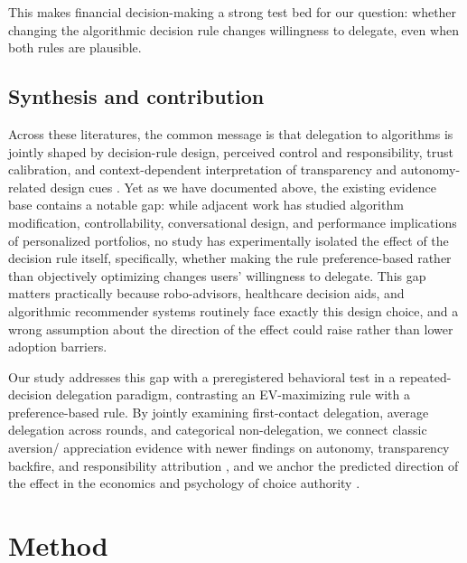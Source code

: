 \documentclass[a4paper, 12pt, fleqn]{article}
\theoremstyle{definition}
\begin{document}
This makes financial decision-making a strong test bed for our question: whether changing the algorithmic decision rule changes willingness to delegate, even when both rules are plausible.

\subsection{Synthesis and contribution}
Across these literatures, the common message is that delegation to algorithms is jointly shaped by decision-rule design, perceived control and responsibility, trust calibration, and context-dependent interpretation of transparency and autonomy-related design cues \citep{Dietvorst2018,Chugunova2022,Schaap2024,Fink2024,Hu2024}. Yet as we have documented above, the existing evidence base contains a notable gap: while adjacent work has studied algorithm modification, controllability, conversational design, and performance implications of personalized portfolios, no study has experimentally isolated the effect of the decision rule itself, specifically, whether making the rule preference-based rather than objectively optimizing changes users' willingness to delegate. This gap matters practically because robo-advisors, healthcare decision aids, and algorithmic recommender systems routinely face exactly this design choice, and a wrong assumption about the direction of the effect could raise rather than lower adoption barriers.

Our study addresses this gap with a preregistered behavioral test in a repeated-decision delegation paradigm, contrasting an EV-maximizing rule with a preference-based rule. By jointly examining first-contact delegation, average delegation across rounds, and categorical non-delegation, we connect classic aversion/ appreciation evidence with newer findings on autonomy, transparency backfire, and responsibility attribution \citep{Logg2019,Fink2024,Hu2024,Gazit2023}, and we anchor the predicted direction of the effect in the economics and psychology of choice authority \citep{Brehm1966,DeciRyan2000,FreyBenzStutzer2004,Leotti2010,Bartling2014,Owens2014}.

\section{Method}
\label{sec:method}
\end{document}
